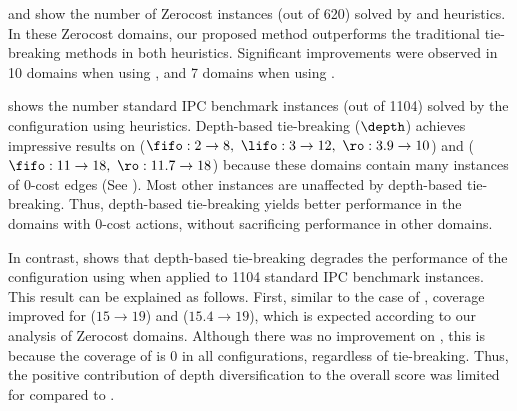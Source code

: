  and  show the number of Zerocost
instances (out of 620) solved by \lmcut and \mands heuristics. In these
Zerocost domains, our proposed method outperforms the traditional tie-breaking methods in both heuristics.
Significant improvements were observed in 10 domains when using \lmcut, and 7 domains when using \mands.


 shows the number standard IPC benchmark instances (out of 1104) solved by the configuration using \lmcut
heuristics. Depth-based tie-breaking ($\depth$) achieves impressive results on  ($\fifo:2\to 8,\ \lifo:3\to 12,\  \ro:3.9\to 10$) and  ($\fifo: 11\to 18,\ \ro: 11.7\to 18$) because these
domains contain many instances of 0-cost edges (See
).  Most other instances are unaffected by depth-based tie-breaking.  Thus, depth-based
tie-breaking yields better performance in the domains with 0-cost actions, without sacrificing performance in
other domains.

In contrast,  shows that depth-based tie-breaking degrades the performance of
the configuration using \mands when applied to {1104 standard IPC benchmark instances}. This result can be explained as follows.
First,  similar to the case of \lmcut,  coverage improved for \fifo ($15\to 19$) and \ro ($15.4\to 19$), which is expected according to our analysis of Zerocost domains.
%
Although there was no improvement on , this is because 
the coverage of  is 0 in all \mands configurations, regardless of tie-breaking. Thus, the positive
contribution of depth diversification to the overall score was limited for \mands compared to \lmcut.


